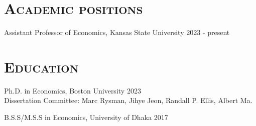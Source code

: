 \documentclass[11pt,overlapped,line,letterpaper]{res}
\newenvironment{list1}{
  \begin{list}{\ding{113}}{%
      \setlength{\itemsep}{0in} \setlength{\itemindent}{-1.6em}
      \setlength{\parsep}{0in} \setlength{\parskip}{0in}
      \setlength{\topsep}{0in} \setlength{\partopsep}{0in}
      \setlength{\leftmargin}{0.5in}}}{\end{list}}
\begin{document}
\thispagestyle{empty}
\begin{resume}
\section{\textbf{\textsc{Academic positions}}}
\begin{list1}
\item[] Assistant Professor of Economics, Kansas State University  \hfill{2023 - present} 
\end{list1}

\section{\textbf{\textsc{Education}}}
\begin{list1}
\item[] Ph.D. in Economics, Boston University  \hfill{2023} \\
Dissertation Committee: Marc Rysman, Jihye Jeon, Randall P. Ellis, Albert Ma.
\vspace{7pt}
\item[] B.S.S/M.S.S in Economics, University of Dhaka \hfill{2017}
\end{list1}



\end{resume}
\end{document}
